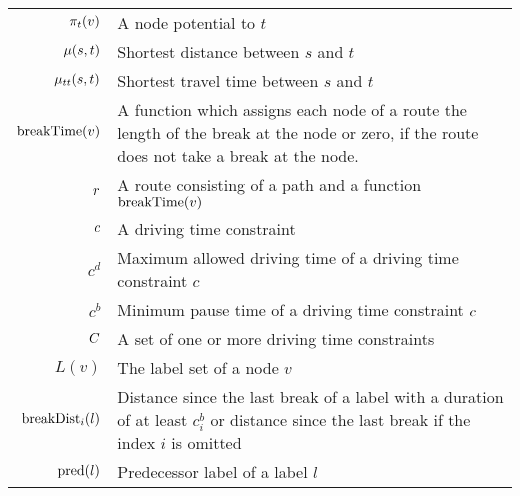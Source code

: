 \begin{tabular}{rp{}}
	$\pi_t(v)$         & A node potential to $t$                                                                                                                    \\
	$\mu(s,t)$          & Shortest distance between $s$ and $t$                                                                                                      \\
	$\mu_{tt}(s,t)$        & Shortest travel time between $s$ and $t$                                                                                                   \\
	$\operatorname{breakTime}(v)$           & A function which assigns each node of a route the length of the break at the node or zero, if the route does not take a break at the node.
	\\
	$r$                  & A route consisting of a path and a function $\operatorname{breakTime}(v)$                                                                                \\
	$c$                  & A driving time constraint                                                                                                                  \\
	$c^d$                     & Maximum allowed driving time of a driving time constraint $c$                                                                              \\
	$c^b$                     & Minimum pause time of a driving time constraint $c$                                                                                   \\
	$C$               & A set of one or more driving time constraints                                                                                              \\
	$L(v)$                    & The label set of a node $v$                                                                                                                \\
	$\operatorname{breakDist}_i(l)$         & Distance since the last break of a label with a duration of at least $c_i^b$ or distance since the last break if the index $i$ is omitted  \\
	$\operatorname{pred}(l)$                & Predecessor label of a label $l$                                                                                                           \\


\end{tabular}
